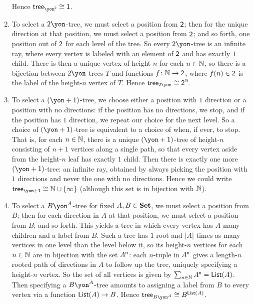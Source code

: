 \documentclass[Book-Poly]{subfiles}
\begin{document}
\begin{exercise}
\begin{solution}
\begin{enumerate}
    Hence $\tr_{\yon^\2}\iso\1$.
    \item To select a $\2\yon$-tree, we must select a position from $\textsf{2}$; then for the unique direction at that position, we must select a position from $\textsf{2}$; and so forth, one position out of $\textsf{2}$ for each level of the tree.
    So every $\2\yon$-tree is an infinite ray, where every vertex is labeled with an element of $\textsf{2}$ and has exactly $1$ child.
    There is then a unique vertex of height $n$ for each $n\in\mathbb{N}$, so there is a bijection between $2\yon$-trees $T$ and functions $f\colon\mathbb{N}\to\textsf{2}$, where $f(n)\in\textsf{2}$ is the label of the height-$n$ vertex of $T$.
    Hence $\tr_{\2\yon}\iso\2^\nn$.
    \item To select a $(\yon+\1)$-tree, we choose either a position with $1$ direction or a position with no directions: if the position has no directions, we stop, and if the position has $1$ direction, we repeat our choice for the next level.
    So a choice of $(\yon+\1)$-tree is equivalent to a choice of when, if ever, to stop.
    That is, for each $n\in\mathbb{N}$, there is a unique $(\yon+\1)$-tree of height-$n$ consisting of $n+1$ vertices along a single path, so that every vertex aside from the height-$n$ leaf has exactly $1$ child.
    Then there is exactly one more $(\yon+\1)$-tree: an infinite ray, obtained by always picking the position with $1$ directions and never the one with no directions.
    Hence we could write $\tr_{\yon+\1}\iso\nn\cup\{\infty\}$ (although this set is in bijection with $\mathbb{N}$).
    \item To select a $B\yon^A$-tree for fixed $A,B\in\mathbf{Set}$, we must select a position from $B$; then for each direction in $A$ at that position, we must select a position from $B$; and so forth.
    This yields a tree in which every vertex has $A$-many children and a label from $B$.
    Such a tree has $1$ root and $|A|$ times as many vertices in one level than the level below it, so its height-$n$ vertices for each $n\in\mathbb{N}$ are in bijection with the set $A^{\mathsf{n}}$: each $n$-tuple in $A^{\mathsf{n}}$ gives a length-$n$ rooted path of directions in $A$ to follow up the tree, uniquely specifying a height-$n$ vertex.
    So the set of all vertices is given by $\sum_{n\in\mathbb{N}}A^{\mathsf{n}}=\mathsf{List}(A)$.
    Then specifying a $B\yon^A$-tree amounts to assigning a label from $B$ to every vertex via a function $\mathsf{List}(A)\to B$.
    Hence $\tr_{B\yon^A}\iso B^{\lst(A)}$.
\end{enumerate}
\end{solution}
\end{exercise}
\end{document}
